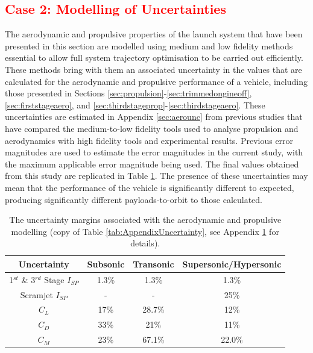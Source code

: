 \textcolor{red}{
	\section{Case 2: Modelling of Uncertainties}\label{sec:unc}
}
\noindent
The aerodynamic and propulsive properties of the launch system that have been presented in this section are modelled using medium and low fidelity methods essential to allow full system trajectory optimisation to be carried out efficiently. These methods bring with them an associated uncertainty in the values that are calculated for the aerodynamic and propulsive performance of a vehicle, including those presented in Sections \ref{sec:propulsion}-\ref{sec:trimmedongineoff}, \ref{sec:firststageaero}, and \ref{sec:thirdstageprop}-\ref{sec:thirdstageaero}. These uncertainties are estimated in Appendix \ref{sec:aerounc} from previous studies that have compared the medium-to-low fidelity tools used to analyse propulsion and aerodynamics with high fidelity tools and experimental results. Previous error magnitudes are used to estimate the error magnitudes in the current study, with the maximum applicable error magnitude being used. The final values obtained from this study are replicated in Table \ref{tab:AppendixUncertaintyCopy}. The presence of these uncertainties may mean that the performance of the vehicle is significantly different to expected, producing significantly different payloads-to-orbit to those calculated. 

\begin{table}[ht]
	\centering
	\begin{tabular}{|c|c|c|c|}
		\hline  Uncertainty & Subsonic & Transonic  & Supersonic/Hypersonic \\ 
		\hline  1$^{st}$ \& 3$^{rd}$ Stage $I_{SP}$ & 1.3\% & 1.3\% &  1.3\% \\ 
		\hline  Scramjet $I_{SP}$ & - & - &  25\% \\ 
		\hline   $C_L$ & 17\% & 28.7\% & 12\% \\  
		\hline   $C_D$ & 33\% & 21\% & 11\% \\  
		\hline   $C_M$  & 23\% & 67.1\% &  22.0\% \\ 
		\hline 
	\end{tabular}
	\caption{The uncertainty margins associated with the aerodynamic and propulsive modelling (copy of Table \ref{tab:AppendixUncertainty}, see Appendix \ref{tab:AppendixUncertaintyCopy} for details).}
	\label{tab:AppendixUncertaintyCopy}
\end{table}


